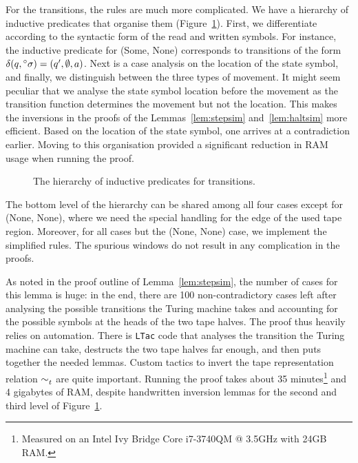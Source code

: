 For the transitions, the rules are much more complicated. We have a hierarchy of inductive predicates that organise them (Figure~\ref{fig:orga_rules}). First, we differentiate according to the syntactic form of the read and written symbols. For instance, the inductive predicate for (Some, None) corresponds to transitions of the form $\delta (q, \prescript{\circ}{}\sigma) = (q', \emptyset, a)$. 
Next is a case analysis on the location of the state symbol, and finally, we distinguish between the three types of movement.
It might seem peculiar that we analyse the state symbol location before the movement as the transition function determines the movement but not the location. This makes the inversions in the proofs of the Lemmas~\ref{lem:stepsim} and~\ref{lem:haltsim} more efficient. Based on the location of the state symbol, one arrives at a contradiction earlier. Moving to this organisation provided a significant reduction in RAM usage when running the proof. 
\begin{figure}
  \begin{center}
  \end{center}
  \caption{The hierarchy of inductive predicates for transitions.}\label{fig:orga_rules}
\end{figure}

The bottom level of the hierarchy can be shared among all four cases except for (None, None), where we need the special handling for the edge of the used tape region. Moreover, for all cases but the (None, None) case, we implement the simplified rules. The spurious windows do not result in any complication in the proofs.

As noted in the proof outline of Lemma~\ref{lem:stepsim}, the number of cases for this lemma is huge: in the end, there are 100 non-contradictory cases left after analysing the possible transitions the Turing machine takes and accounting for the possible symbols at the heads of the two tape halves. The proof thus heavily relies on automation. There is \texttt{LTac} code that analyses the transition the Turing machine can take, destructs the two tape halves far enough, and then puts together the needed lemmas. Custom tactics to invert the tape representation relation $\sim_t^{}$ are quite important.
Running the proof takes about 35 minutes\footnote{Measured on an Intel Ivy Bridge Core i7-3740QM @ 3.5GHz with 24GB RAM.} and 4 gigabytes of RAM, despite handwritten inversion lemmas for the second and third level of Figure~\ref{fig:orga_rules}. 

